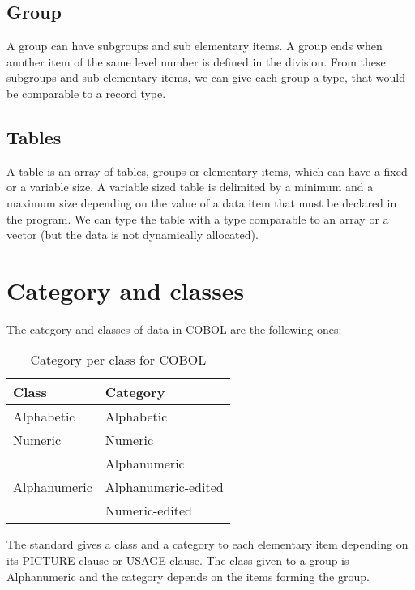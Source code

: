 \documentclass[a4paper,10pt]{article}
\begin{document}
\subsection{Group}
A group can have subgroups and sub elementary items. A group ends when another item of the same
level number is defined in the division. From these subgroups and sub elementary items, we can
give each group a type, that would be comparable to a record type.

\subsection{Tables}
A table is an array of tables, groups or elementary items, which can have a fixed or a variable
size. A variable sized table is delimited by a minimum and a maximum size depending on the
value of a data item that must be declared in the program. We can type the table with a type
comparable to an array or a vector (but the data is not dynamically allocated).
\pagebreak

\section{Category and classes}
The category and classes of data in COBOL are the following ones:
\begin{table}[H]
  \centering
  \begin{tabular}{|l|l|}
    \hline
    \textbf{Class}                & \textbf{Category}   \\ \hline
    Alphabetic                    & Alphabetic          \\ \hline
    Numeric                       & Numeric             \\ \hline
    \multirow{3}{*}{Alphanumeric} & Alphanumeric        \\ \cline{2-2}
                                  & Alphanumeric-edited \\ \cline{2-2}
                                  & Numeric-edited      \\ \hline
  \end{tabular}
  \caption{Category per class for COBOL}
  \label{tab:cat_class}
\end{table}
The standard gives a class and a category to each elementary item depending on its PICTURE clause
or USAGE clause. The class given to a group is Alphanumeric and the category depends on the
items forming the group.
\end{document}
